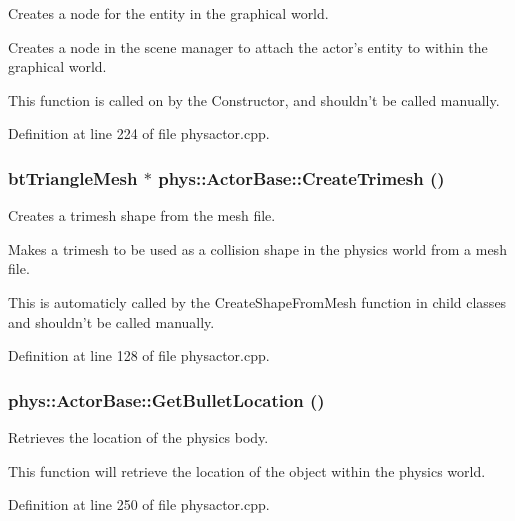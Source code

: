 Creates a node for the entity in the graphical world. 

Creates a node in the scene manager to attach the actor's entity to within the graphical world. \par
 This function is called on by the Constructor, and shouldn't be called manually. 

Definition at line 224 of file physactor.cpp.

\hypertarget{classphys_1_1ActorBase_a4d2137276c50bbe5bc8cf9ecc66581b7}{
\subsubsection[{CreateTrimesh}]{\setlength{\rightskip}{0pt plus 5cm}btTriangleMesh $\ast$ phys::ActorBase::CreateTrimesh ()}}
\label{d8/d0f/classphys_1_1ActorBase_a4d2137276c50bbe5bc8cf9ecc66581b7}


Creates a trimesh shape from the mesh file. 

Makes a trimesh to be used as a collision shape in the physics world from a mesh file. \par
 This is automaticly called by the CreateShapeFromMesh function in child classes and shouldn't be called manually. 

Definition at line 128 of file physactor.cpp.

\hypertarget{classphys_1_1ActorBase_ac7c8bbb4859668d71325a791c88584ae}{
\subsubsection[{GetBulletLocation}]{ phys::ActorBase::GetBulletLocation ()}}
\label{d8/d0f/classphys_1_1ActorBase_ac7c8bbb4859668d71325a791c88584ae}


Retrieves the location of the physics body. 

This function will retrieve the location of the object within the physics world. 

Definition at line 250 of file physactor.cpp.

